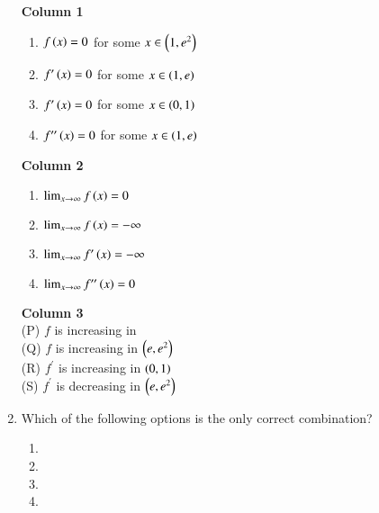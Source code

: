 \documentclass[journal]{IEEEtran}
\begin{document}
\begin{enumerate}
\noindent
\begin{minipage}[t]{0.32\textwidth}
 \textbf{Column 1}\\
 \begin{enumerate}[label=(\Roman*)] 
     \item $f\left(x\right)=0$ for some $x \in \left(1,e^{2}\right)$
     \item $f^{\prime}\left(x\right)=0$ for some $x \in \left(1,e\right)$
     \item $f^{\prime}\left(x\right)=0$ for some $x \in \left(0,1\right)$
     \item $f^{\prime\prime}\left(x\right)=0$ for some $x \in \left(1,e\right)$
 \end{enumerate}
\end{minipage}
\hfill
\begin{minipage}[t]{0.28\textwidth}
    \textbf{Column 2}\\
\begin{enumerate}[label=(\roman*)] 
\item $\lim_{x \to \infty} f\left(x\right) = 0 $
\item $ \lim_{x \to \infty} f\left(x\right) = -\infty $
\item $\lim_{x \to \infty} f^{\prime}\left(x\right) = -\infty $
\item $\lim_{x \to \infty} f^{\prime\prime}\left(x\right) = 0 $
\end{enumerate}
\end{minipage}
\hfill
\begin{minipage}[t]{0.3\textwidth}
    \textbf{Column 3}\\
    
 (P) $f$ is increasing in  \\
 (Q) $f$ is increasing in $\left(e,e^{2}\right)$ \\
 (R) $f^{\prime}$ is increasing in $\left(0,1\right) $ \\
 (S) $f^{\prime}$ is decreasing in $\left(e,e^{2}\right) $ \\
 
\end{minipage}

\item Which of the following options is the only correct combination?
\begin{enumerate}
    \item {}
    \item {}
    \item {}
    \item {}
\end{enumerate}
    


\end{enumerate}
\end{document}
